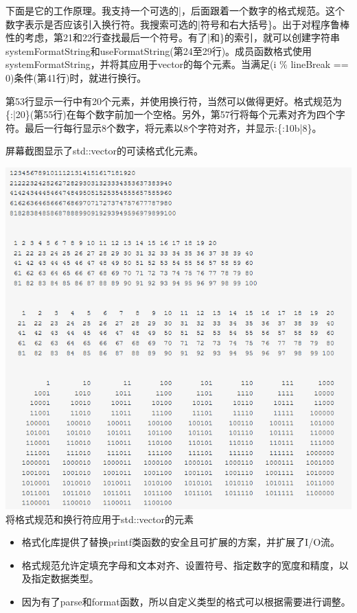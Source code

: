 下面是它的工作原理。我支持一个可选的|，后面跟着一个数字的格式规范。这个数字表示是否应该引入换行符。我搜索可选的|符号和右大括号\}。出于对程序鲁棒性的考虑，第21和22行查找最后一个符号。有了|和\}的索引，就可以创建字符串systemFormatString和useFormatString(第24至29行)。成员函数格式使用systemFormatString，并将其应用于vector的每个元素。当满足(i \% lineBreak == 0)条件(第41行)时，就进行换行。

第53行显示一行中有20个元素，并使用换行符，当然可以做得更好。格式规范为\{:|20\}(第55行)在每个数字前加一个空格。另外，第57行将每个元素对齐为四个字符。最后一行每行显示8个数字，将元素以8个字符对齐，并显示:\{:10b|8\}。

屏幕截图显示了std::vector的可读格式化元素。

\begin{center}
\includegraphics[width=1.0\textwidth]{content/3/chapter5/images/31.png}\\
将格式规范和换行符应用于std::vector的元素
\end{center}

\begin{tcolorbox}[breakable,enhanced jigsaw,colback=mygreen!5!white,colframe=mygreen!75!black,title={总结}]
	
\begin{itemize}
\item 
格式化库提供了替换printf类函数的安全且可扩展的方案，并扩展了I/O流。

\item 
格式规范允许定填充字母和文本对齐、设置符号、指定数字的宽度和精度，以及指定数据类型。

\item 
因为有了parse和format函数，所以自定义类型的格式可以根据需要进行调整。
\end{itemize}
	
\end{tcolorbox}

\newpage




